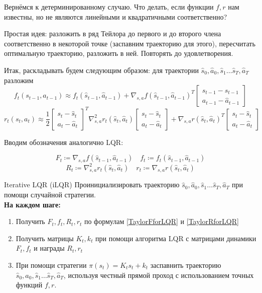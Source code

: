 Вернёмся к детерминированному случаю. Что делать, если функции $f, r$ нам известны, но не являются линейными и квадратичными соответственно?

Простая идея: разложить в ряд Тейлора до первого и до второго члена соответственно в некоторой точке (заспавним траекторию для этого), пересчитать оптимальную траекторию, разложить в ней. Повторять до удовлетворения.

Итак, раскладывать будем следующим образом: для траектории $\hat{s}_0, \hat{a}_0, \hat{s}_1 \dots \hat{s}_T, \hat{a}_T$ разложим
$$f_t(s_{t-1}, a_{t-1}) \approx f_t(\hat{s}_{t-1}, \hat{a}_{t-1}) + \nabla_{s, a} f(\hat{s}_{t-1}, \hat{a}_{t-1})^T \begin{bmatrix} s_{t-1} - \hat{s}_{t-1} \\ a_{t-1} - \hat{a}_{t-1} \end{bmatrix}$$
$$r_t(s_t, a_t) \approx \frac{1}{2}\begin{bmatrix} s_t - \hat{s}_t \\ a_t - \hat{a}_t \end{bmatrix}^T \nabla^2_{s, a} r_t(\hat{s}_{t}, \hat{a}_{t})\begin{bmatrix} s_t - \hat{s}_t \\ a_t - \hat{a}_t \end{bmatrix} + \nabla_{s, a} r(\hat{s}_t, \hat{a}_t)^T \begin{bmatrix} s_t - \hat{s}_t \\ a_t - \hat{a}_t \end{bmatrix}$$

Вводим обозначения аналогично LQR:

\begin{equation}\label{TaylorFforLQR}
F_t \coloneqq \nabla_{s, a} f(\hat{s}_{t-1}, \hat{a}_{t-1}) \quad f_t \coloneqq f_t(\hat{s}_{t-1}, \hat{a}_{t-1})
\end{equation}
\begin{equation}\label{TaylorRforLQR}
R_t \coloneqq \nabla^2_{s, a} r_t(\hat{s}_{t}, \hat{a}_{t}) \quad r_t \coloneqq \nabla_{s, a} r(\hat{s}_t, \hat{a}_t)
\end{equation}

\begin{algorithm}{Iterative LQR (iLQR)}
Проинициализировать траекторию $\hat{s}_0, \hat{a}_0, \hat{s}_1 \dots \hat{s}_T, \hat{a}_T$ при помощи случайной стратегии. \\ 
\textbf{На каждом шаге:}
\begin{enumerate}
    \item Получить $F_t, f_t, R_t, r_t$ по формулам \eqref{TaylorFforLQR} и \eqref{TaylorRforLQR}
    \item Получить матрицы $K_t, k_t$ при помощи алгоритма LQR с матрицами динамики $F_t, f_t$ и награды $R_t, r_t$
    \item При помощи стратегии $\pi(s_t) = K_t s_t + k_t$ заспавнить траекторию $\hat{s}_0, \hat{a}_0, \hat{s}_1 \dots \hat{s}_T, \hat{a}_T$, используя честный прямой проход с использованием точных функций $f, r$.
\end{enumerate}
\end{algorithm}

